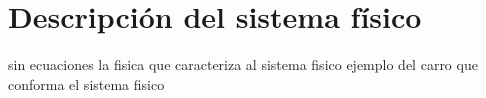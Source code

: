 \documentclass[../main.tex]{subfiles}
\begin{document}
\chapter{Descripción del sistema físico}
sin ecuaciones
la fisica que caracteriza al sistema fisico
ejemplo del carro
que conforma el sistema fisico
\end{document}
